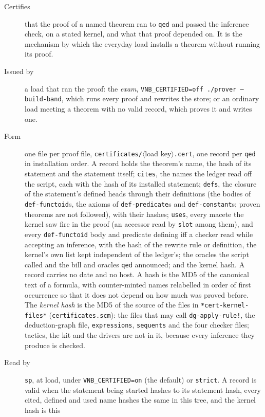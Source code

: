 \begin{description}
\item[Certifies] that the proof of a named theorem ran to \texttt{qed} and
  passed the inference check, on a stated kernel, and what that proof
  depended on.  It is the mechanism by which the
  everyday load installs a theorem without running its proof.
\item[Issued by] a load that ran the proof: the \emph{exam},
  \texttt{VNB\_CERTIFIED=off ./prover --build-band}, which runs every proof
  and rewrites the store; or an ordinary load meeting a theorem with no
  valid record, which proves it and writes one.
\item[Form] one file per proof file, \texttt{certificates/}$\langle$load
  key$\rangle$\texttt{.cert}, one record per \texttt{qed} in installation
  order.  A record holds the theorem's name, the hash of its statement and
  the statement itself; \texttt{cites}, the names the ledger read off the
  script, each with the hash of its installed statement; \texttt{defs},
  the closure of the statement's defined heads through their definitions
  (the bodies of \texttt{def-functoid}s, the axioms of \texttt{def-predicate}s
  and \texttt{def-constant}s; proven theorems are not followed), with their hashes;
  \texttt{uses}, every macete the kernel saw fire in the proof (an accessor
  read by \texttt{slot} among them), and every \texttt{def-functoid} body and
  predicate defining iff a checker read while accepting an inference, with
  the hash of the rewrite rule or definition, the kernel's own list kept
  independent of the ledger's; the oracles the script called and the bill and oracles
  \texttt{qed} announced; and the kernel hash.  A record carries no date and no host.  A hash is
  the MD5 of the canonical text of a formula, with counter-minted names
  relabelled in order of first occurrence so that it does not depend on
  how much was proved before.  The \emph{kernel hash} is the MD5 of the
  source of the files in \texttt{*cert-kernel-files*}
  (\texttt{certificates.scm}): the files that may call
  \texttt{dg-apply-rule!}, the deduction-graph file, \texttt{expressions},
  \texttt{sequents} and the four checker files; tactics, the kit and
  the drivers are not in it, because every inference they produce is
  checked.
\item[Read by] \texttt{sp}, at load, under \texttt{VNB\_CERTIFIED=on}
  (the default) or \texttt{strict}.  A record is valid when the statement
  being started hashes to its statement hash, every cited, defined and
  used name hashes the same in this tree, and the kernel hash is this

\end{description}
